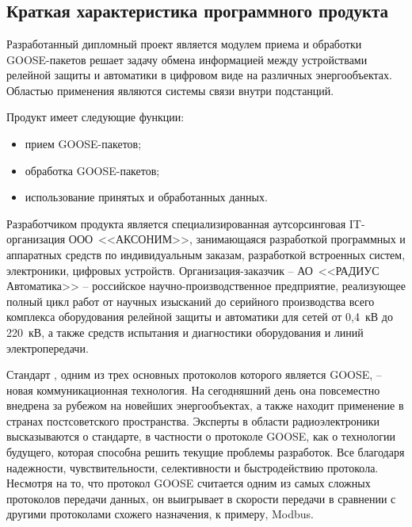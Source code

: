 \section{\texorpdfstring{\MakeUppercase \economicalPartName}{\economicalPartName}}


\subsection{Краткая характеристика программного продукта}

Разработанный дипломный проект является модулем приема и обработки
GOOSE-пакетов решает задачу обмена информацией между устройствами релейной защиты
и автоматики в цифровом виде на различных энергообъектах. Областью применения
являются системы связи внутри подстанций.

Продукт имеет следующие функции:
\begin{itemize}
  \item прием GOOSE-пакетов;
  \item обработка GOOSE-пакетов;
  \item использование принятых и обработанных данных.
\end{itemize}

Разработчиком продукта является специализированная аутсорсинговая IT-организация
ООО~<<АКСОНИМ>>, занимающаяся разработкой программных и аппаратных средств
по индивидуальным заказам, разработкой встроенных систем, электроники,
цифровых устройств. Организация-заказчик -- АО~<<РАДИУС Автоматика>> --
российское научно-производственное предприятие, реализующее полный цикл работ
от научных изысканий до серийного производства всего комплекса оборудования
релейной защиты и автоматики для сетей от 0,4~кВ до 220~кВ, а также средств испытания
и диагностики оборудования и линий электропередачи.

Стандарт , одним из трех основных протоколов которого является GOOSE,
-- новая коммуникационная технология. На сегодняшний день она повсеместно внедрена
за рубежом на новейших энергообъектах, а также находит применение в странах
постсоветского пространства. Эксперты в области радиоэлектроники высказываются
о стандарте, в частности о протоколе GOOSE, как о технологии будущего,
которая способна решить текущие проблемы разработок. Все благодаря надежности,
чувствительности, селективности и быстродействию протокола. Несмотря на то, что
протокол GOOSE считается одним из самых сложных протоколов передачи данных,
он выигрывает в скорости передачи в сравнении с другими протоколами схожего
назначения, к примеру, Modbus.

